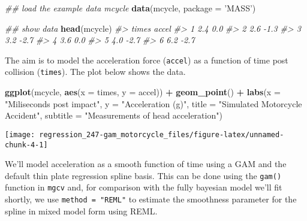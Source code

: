 \documentclass[]{book}
\newenvironment{Shaded}{\begin{snugshade}}{\end{snugshade}}
\newcommand{\CommentTok}[1]{\textcolor[rgb]{0.56,0.35,0.01}{\textit{#1}}}
\newcommand{\DataTypeTok}[1]{\textcolor[rgb]{0.13,0.29,0.53}{#1}}
\newcommand{\KeywordTok}[1]{\textcolor[rgb]{0.13,0.29,0.53}{\textbf{#1}}}
\newcommand{\NormalTok}[1]{#1}
\newcommand{\OperatorTok}[1]{\textcolor[rgb]{0.81,0.36,0.00}{\textbf{#1}}}
\newcommand{\StringTok}[1]{\textcolor[rgb]{0.31,0.60,0.02}{#1}}
\begin{document}
\begin{Shaded}
\begin{Highlighting}[]
\CommentTok{## load the example data mcycle}
\KeywordTok{data}\NormalTok{(mcycle, }\DataTypeTok{package =} \StringTok{'MASS'}\NormalTok{)}

\CommentTok{## show data}
\KeywordTok{head}\NormalTok{(mcycle)}
\CommentTok{#>   times accel}
\CommentTok{#> 1   2.4   0.0}
\CommentTok{#> 2   2.6  -1.3}
\CommentTok{#> 3   3.2  -2.7}
\CommentTok{#> 4   3.6   0.0}
\CommentTok{#> 5   4.0  -2.7}
\CommentTok{#> 6   6.2  -2.7}
\end{Highlighting}
\end{Shaded}

The aim is to model the acceleration force (\texttt{accel}) as a function of time post collision (\texttt{times}). The plot below shows the data.

\begin{Shaded}
\begin{Highlighting}[]
\KeywordTok{ggplot}\NormalTok{(mcycle, }\KeywordTok{aes}\NormalTok{(}\DataTypeTok{x =}\NormalTok{ times, }\DataTypeTok{y =}\NormalTok{ accel)) }\OperatorTok{+}
\StringTok{    }\KeywordTok{geom_point}\NormalTok{() }\OperatorTok{+}
\StringTok{    }\KeywordTok{labs}\NormalTok{(}\DataTypeTok{x =} \StringTok{"Miliseconds post impact"}\NormalTok{, }\DataTypeTok{y =} \StringTok{"Acceleration (g)"}\NormalTok{,}
         \DataTypeTok{title =} \StringTok{"Simulated Motorcycle Accident"}\NormalTok{,}
         \DataTypeTok{subtitle =} \StringTok{"Measurements of head acceleration"}\NormalTok{)}
\end{Highlighting}
\end{Shaded}

\begin{center}\texttt{[image: regression\_247-gam\_motorcycle\_files/figure-latex/unnamed-chunk-4-1]} \end{center}

We'll model acceleration as a smooth function of time using a GAM and the default thin plate regression spline basis. This can be done using the \texttt{gam()} function in \texttt{mgcv} and, for comparison with the fully bayesian model we'll fit shortly, we use \texttt{method\ =\ "REML"} to estimate the smoothness parameter for the spline in mixed model form using REML.\\
\end{document}
